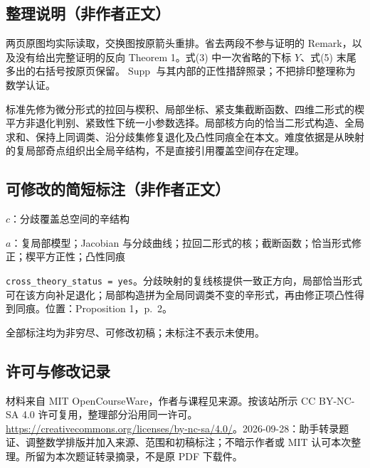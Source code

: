 \documentclass[UTF8,11pt]{ctexart}
\theoremstyle{definition}
\begin{document}
\subsection*{整理说明（非作者正文）}
两页原图均实际读取，交换图按原箭头重排。省去两段不参与证明的 Remark，以及没有给出完整证明的反向 Theorem 1。式(3) 中一次省略的下标 $Y$、式(5) 末尾多出的右括号按原页保留。$\operatorname{Supp}$ 与其内部的正性措辞照录；不把排印整理称为数学认证。

标准先修为微分形式的拉回与楔积、局部坐标、紧支集截断函数、四维二形式的楔平方非退化判别、紧致性下统一小参数选择。局部核方向的恰当二形式构造、全局求和、保持上同调类、沿分歧集修复退化及凸性同痕全在本文。难度依据是从映射的复局部奇点组织出全局辛结构，不是直接引用覆盖空间存在定理。
\subsection*{可修改的简短标注（非作者正文）}
$c$：分歧覆盖总空间的辛结构

$a$：复局部模型；Jacobian 与分歧曲线；拉回二形式的核；截断函数；恰当形式修正；楔平方正性；凸性同痕

\texttt{cross\_theory\_status = yes}。分歧映射的复线核提供一致正方向，局部恰当形式可在该方向补足退化；局部构造拼为全局同调类不变的辛形式，再由修正项凸性得到同痕。位置：Proposition 1，p.~2。

全部标注均为非穷尽、可修改初稿；未标注不表示未使用。
\subsection*{许可与修改记录}
材料来自 MIT OpenCourseWare，作者与课程见来源。按该站所示 CC BY-NC-SA 4.0 许可复用，整理部分沿用同一许可。\url{https://creativecommons.org/licenses/by-nc-sa/4.0/}。2026-09-28：助手转录题证、调整数学排版并加入来源、范围和初稿标注；不暗示作者或 MIT 认可本次整理。所留为本次题证转录摘录，不是原 PDF 下载件。
\end{document}
